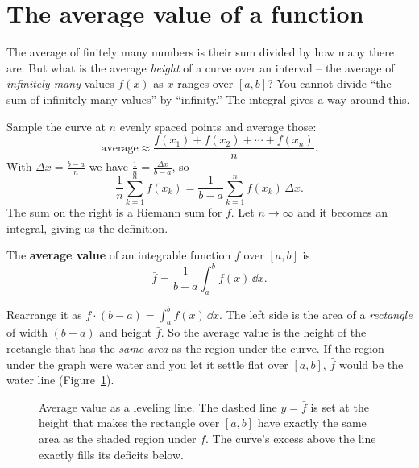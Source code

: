 \section{The average value of a function}
\label{ch20:average}

The average of finitely many numbers is their sum divided by how
many there are. But what is the average \emph{height} of a curve over an interval
-- the average of \emph{infinitely many} values $f(x)$ as $x$ ranges over
$[a,b]$? You cannot divide ``the sum of infinitely many values'' by ``infinity.''
The integral gives a way around this.

Sample the curve at $n$ evenly spaced points and average those:
\[
  \text{average} \approx \frac{f(x_1)+f(x_2)+\cdots+f(x_n)}{n}.
\]
With $\Delta x = \tfrac{b-a}{n}$ we have $\tfrac1n =
\tfrac{\Delta x}{b-a}$, so
\[
  \frac{1}{n}\sum_{k=1}^{n} f(x_k)
  = \frac{1}{b-a}\sum_{k=1}^{n} f(x_k)\,\Delta x.
\]
The sum on the right is a Riemann sum for $f$. Let $n \to \infty$ and it becomes
an integral, giving us the definition.

\begin{definition}
\label{ch20:def-average}
The \textbf{average value} of an integrable function $f$ over $[a,b]$ is
\[
  \bar f = \frac{1}{b-a}\int_a^b f(x)\,\dd x.
\]
\end{definition}

\begin{intuitionbox}
Rearrange it as $\bar f \cdot (b-a) = \int_a^b f(x)\,\dd x$. The left side is the
area of a \emph{rectangle} of width $(b-a)$ and height $\bar f$. So the average
value is the height of the rectangle that has the \emph{same area} as the region
under the curve. If the region under the graph were water and you let it settle
flat over $[a,b]$, $\bar f$ would be the water line (Figure~\ref{ch20:fig-average}).
\end{intuitionbox}

\begin{figure}[htbp]
\centering
{}
\caption{Average value as a leveling line. The dashed line $y=\bar f$ is set at
the height that makes the rectangle over $[a,b]$ have exactly the same area as
the shaded region under $f$. The curve's excess above the line exactly fills its
deficits below.}
\label{ch20:fig-average}
\end{figure}

